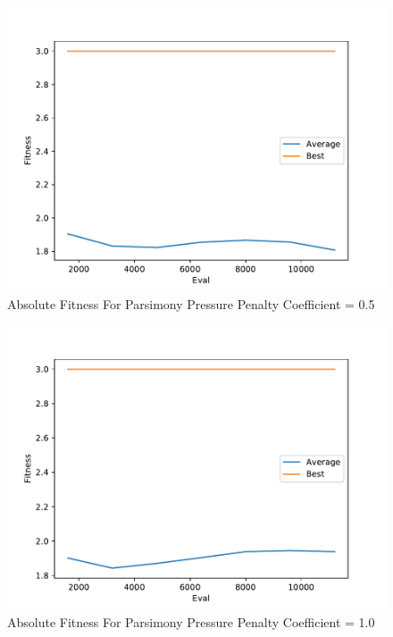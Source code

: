 \documentclass[times]{article}
\begin{document}
	\begin{figure}
		\caption{Absolute Fitness For Parsimony Pressure Penalty Coefficient = 0.5}
		\label{fig:absolute_plot_1}
		\includegraphics[width=\textwidth]{../graph/absolute/1.pdf}
	\end{figure}

	\begin{figure}
		\caption{Absolute Fitness For Parsimony Pressure Penalty Coefficient = 1.0}
		\label{fig:absolute_plot_2}
		\includegraphics[width=\textwidth]{../graph/absolute/2.pdf}
	\end{figure}
\end{document}

